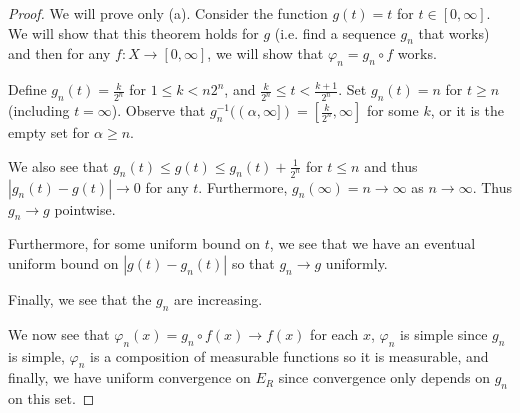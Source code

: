 \documentclass[11pt]{amsart}
\theoremstyle{definition}
\numberwithin{equation}{section}
\begin{document}
\begin{proof} We will prove only (a).
    Consider the function $g(t)=t$ for $t\in[0,\infty]$. We will show that this theorem holds for $g$ (i.e. find a sequence $g_n$ that works) and then for any $f:X\to[0,\infty]$, we will show that $\varphi_n=g_n\circ f$ works.

    Define $g_n(t)=\frac{k}{2^n}$ for $1\le k< n2^n$, and $\frac{k}{2^n}\le t<\frac{k+1}{2^n}$. Set $g_n(t)=n$ for $t\ge n$ (including $t=\infty$). Observe that $g_n^{-1}((\alpha,\infty])=[\frac{k}{2^n},\infty]$ for some $k$, or it is the empty set for $\alpha\ge n$.

    We also see that $g_n(t)\le g(t)\le g_n(t)+\frac{1}{2^n}$ for $t\le n$ and thus $|g_n(t)-g(t)|\to0$ for any $t$. Furthermore, $g_n(\infty)=n\to\infty$ as $n\to\infty$. Thus $g_n\to g$ pointwise.

    Furthermore, for some uniform bound on $t$, we see that we have an eventual uniform bound on $|g(t)-g_n(t)|$ so that $g_n\to g$ uniformly.

    Finally, we see that the $g_n$ are increasing.

    We now see that $\varphi_n(x)=g_n\circ f(x)\to f(x)$ for each $x$, $\varphi_n$ is simple since $g_n$ is simple, $\varphi_n$ is a composition of measurable functions so it is measurable, and finally, we have uniform convergence on $E_R$ since convergence only depends on $g_n$ on this set.
\end{proof}
\end{document}

